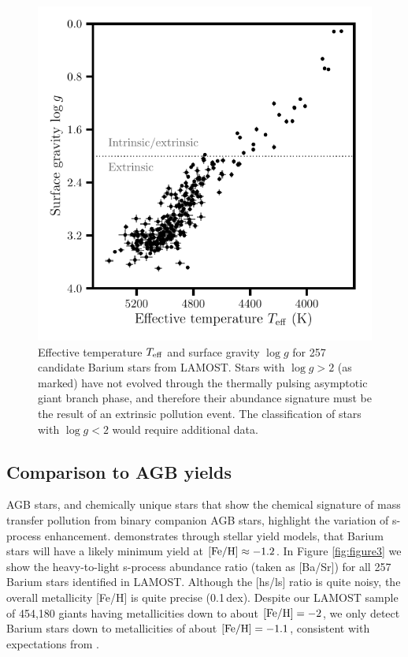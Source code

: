 \documentclass[a4paper,fleqn,usenatbib]{mnras}
\begin{document}
\begin{figure}
	\includegraphics[width=\columnwidth]{hrd.pdf}
    \caption{Effective temperature $T_{\rm eff}$ and surface gravity $\log{g}$ for 257 candidate Barium stars from LAMOST. Stars with $\log{g} > 2$ (as marked) have not evolved through the thermally pulsing asymptotic giant branch phase, and therefore their abundance signature must be the result of an extrinsic pollution event. The classification of stars with $\log{g} < 2$ would require additional data.}
    \label{fig:figure2}
\end{figure}


\subsection{Comparison to AGB yields}
AGB stars, and chemically unique stars that show the chemical signature
of mass transfer pollution from binary companion AGB stars, highlight the variation of s-process enhancement. \citet{karakas_lugaro2016} demonstrates through stellar yield models, that Barium stars will have a likely minimum yield at $[{\rm Fe/H}] \approx -1.2$. In Figure \ref{fig:figure3} we show the heavy-to-light s-process abundance ratio (taken as [Ba/Sr]) for all 257 Barium stars identified in LAMOST. Although the [hs/ls] ratio is quite noisy, the overall metallicity [Fe/H] is quite precise (0.1\,dex). Despite our LAMOST sample of 454,180 giants having metallicities down to about $[{\rm Fe/H}] = -2$, we only detect Barium stars down to metallicities of about $[{\rm Fe/H}] = -1.1$, consistent with expectations from \citep{karakas_lugaro2016}.
\end{document}
